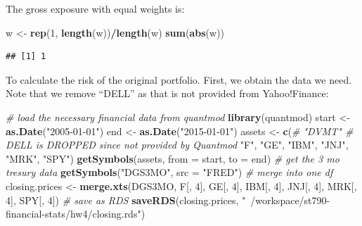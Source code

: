 \documentclass[11pt,]{article}
\newenvironment{Shaded}{\begin{snugshade}}{\end{snugshade}}
\newcommand{\CommentTok}[1]{\textcolor[rgb]{0.56,0.35,0.01}{\textit{#1}}}
\newcommand{\DataTypeTok}[1]{\textcolor[rgb]{0.13,0.29,0.53}{#1}}
\newcommand{\DecValTok}[1]{\textcolor[rgb]{0.00,0.00,0.81}{#1}}
\newcommand{\KeywordTok}[1]{\textcolor[rgb]{0.13,0.29,0.53}{\textbf{#1}}}
\newcommand{\NormalTok}[1]{#1}
\newcommand{\OperatorTok}[1]{\textcolor[rgb]{0.81,0.36,0.00}{\textbf{#1}}}
\newcommand{\StringTok}[1]{\textcolor[rgb]{0.31,0.60,0.02}{#1}}
\renewenvironment{quote}{\begin{shaded*}}{\end{shaded*}}
\begin{document}
\begin{quote}
The gross exposure with equal weights is:
\end{quote}

\begin{Shaded}
\begin{Highlighting}[]
\NormalTok{w <-}\StringTok{ }\KeywordTok{rep}\NormalTok{(}\DecValTok{1}\NormalTok{, }\KeywordTok{length}\NormalTok{(w))}\OperatorTok{/}\KeywordTok{length}\NormalTok{(w)}
\KeywordTok{sum}\NormalTok{(}\KeywordTok{abs}\NormalTok{(w))}
\end{Highlighting}
\end{Shaded}

\begin{verbatim}
## [1] 1
\end{verbatim}

\begin{quote}
To calculate the risk of the original portfolio. First, we obtain the
data we need. Note that we remove ``DELL'' as that is not provided from
Yahoo!Finance:
\end{quote}

\begin{Shaded}
\begin{Highlighting}[]
\CommentTok{# load the necessary financial data from quantmod }
\KeywordTok{library}\NormalTok{(quantmod)}
\NormalTok{start <-}\StringTok{ }\KeywordTok{as.Date}\NormalTok{(}\StringTok{"2005-01-01"}\NormalTok{)}
\NormalTok{end <-}\StringTok{ }\KeywordTok{as.Date}\NormalTok{(}\StringTok{"2015-01-01"}\NormalTok{)}
\NormalTok{assets <-}\StringTok{ }\KeywordTok{c}\NormalTok{(}\CommentTok{# "DVMT" # DELL is DROPPED since not provided by Quantmod}
  \StringTok{"F"}\NormalTok{, }
  \StringTok{"GE"}\NormalTok{, }
  \StringTok{"IBM"}\NormalTok{, }
  \StringTok{"JNJ"}\NormalTok{,}
  \StringTok{"MRK"}\NormalTok{,}
  \StringTok{"SPY"}\NormalTok{)}
\KeywordTok{getSymbols}\NormalTok{(assets, }\DataTypeTok{from =}\NormalTok{ start, }\DataTypeTok{to =}\NormalTok{ end) }
\CommentTok{# get the 3 mo tresury data }
\KeywordTok{getSymbols}\NormalTok{(}\StringTok{"DGS3MO"}\NormalTok{, }\DataTypeTok{src =} \StringTok{"FRED"}\NormalTok{)}
\CommentTok{# merge into one df }
\NormalTok{closing.prices <-}\StringTok{ }\KeywordTok{merge.xts}\NormalTok{(DGS3MO, }
\NormalTok{                            F[, }\DecValTok{4}\NormalTok{], }
\NormalTok{                            GE[, }\DecValTok{4}\NormalTok{],}
\NormalTok{                            IBM[, }\DecValTok{4}\NormalTok{], }
\NormalTok{                            JNJ[, }\DecValTok{4}\NormalTok{], }
\NormalTok{                            MRK[, }\DecValTok{4}\NormalTok{], }
\NormalTok{                            SPY[, }\DecValTok{4}\NormalTok{])}
\CommentTok{# save as RDS }
\KeywordTok{saveRDS}\NormalTok{(closing.prices, }\StringTok{"~/workspace/st790-financial-stats/hw4/closing.rds"}\NormalTok{)}
\end{Highlighting}
\end{Shaded}
\end{document}
